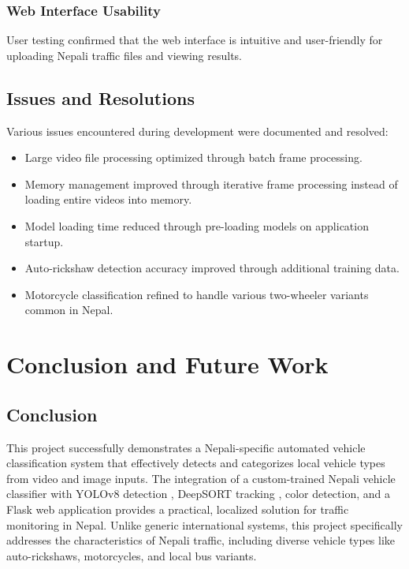 \documentclass[12pt,a4paper]{report}
\begin{document}
\subsection{Web Interface Usability}
User testing confirmed that the web interface is intuitive and user-friendly for uploading Nepali traffic files and viewing results.

\section{Issues and Resolutions}
Various issues encountered during development were documented and resolved:
\begin{itemize}
    \item Large video file processing optimized through batch frame processing.
    \item Memory management improved through iterative frame processing instead of loading entire videos into memory.
    \item Model loading time reduced through pre-loading models on application startup.
    \item Auto-rickshaw detection accuracy improved through additional training data.
    \item Motorcycle classification refined to handle various two-wheeler variants common in Nepal.
\end{itemize}


\chapter{Conclusion and Future Work}

\section{Conclusion}

This project successfully demonstrates a Nepali-specific automated vehicle classification system that effectively detects and categorizes local vehicle types from video and image inputs. The integration of a custom-trained Nepali vehicle classifier with YOLOv8 detection \cite{ultralytics2023yolov8}, DeepSORT tracking \cite{bewley2016deepsort}, color detection, and a Flask web application \cite{flask2023} provides a practical, localized solution for traffic monitoring in Nepal. Unlike generic international systems, this project specifically addresses the characteristics of Nepali traffic, including diverse vehicle types like auto-rickshaws, motorcycles, and local bus variants.
\end{document}
